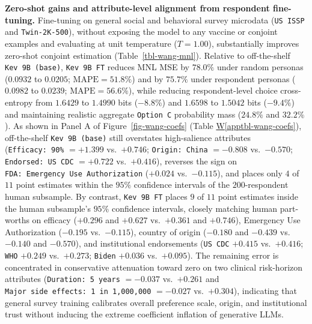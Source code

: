 \documentclass[
  letterpaper,
  DIV=11,
  numbers=noendperiod]{scrartcl}
\newcommand*\quartoapptblref[1]{Table \hyperref[#1]{W\ref{#1}}}
\begin{document}
\textbf{Zero-shot gains and attribute-level alignment from respondent
fine-tuning.} Fine-tuning on general social and behavioral survey
microdata (\texttt{US\ ISSP} and \texttt{Twin-2K-500}), without exposing
the model to any vaccine or conjoint examples and evaluating at unit
temperature (\(T = 1.00\)), substantially improves zero-shot conjoint
estimation (Table~\ref{tbl-wang-mnl}). Relative to off-the-shelf
\texttt{Kev\ 9B\ (base)}, \texttt{Kev\ 9B\ FT} reduces MNL MSE by
\(78.0\%\) under random personas (\(0.0932\) to \(0.0205\);
\(\mathrm{MAPE} = 51.8\%\)) and by \(75.7\%\) under respondent personas
(\(0.0982\) to \(0.0239\); \(\mathrm{MAPE} = 56.6\%\)), while reducing
respondent-level choice cross-entropy from \(1.6429\) to \(1.4990\) bits
(\(-8.8\%\)) and \(1.6598\) to \(1.5042\) bits (\(-9.4\%\)) and
maintaining realistic aggregate \texttt{Option\ C} probability mass
(\(24.8\%\) and \(32.2\%\)). As shown in Panel A of
Figure~\ref{fig-wang-coefs} (\quartoapptblref{apptbl-wang-coefs}),
off-the-shelf \texttt{Kev\ 9B\ (base)} still overstates high-salience
attributes (\texttt{Efficacy:\ 90\%} \(= +1.399\) vs.~\(+0.746\);
\texttt{Origin:\ China} \(= -0.808\) vs.~\(-0.570\);
\texttt{Endorsed:\ US\ CDC} \(= +0.722\) vs.~\(+0.416\)), reverses the
sign on \texttt{FDA:\ Emergency\ Use\ Authorization} (\(+0.024\)
vs.~\(-0.115\)), and places only \(4\) of \(11\) point estimates within
the \(95\%\) confidence intervals of the \(200\)-respondent human
subsample. By contrast, \texttt{Kev\ 9B\ FT} places \(9\) of \(11\)
point estimates inside the human subsample's \(95\%\) confidence
intervals, closely matching human part-worths on efficacy (\(+0.296\)
and \(+0.627\) vs.~\(+0.361\) and \(+0.746\)), Emergency Use
Authorization (\(-0.195\) vs.~\(-0.115\)), country of origin (\(-0.180\)
and \(-0.439\) vs.~\(-0.140\) and \(-0.570\)), and institutional
endorsements (\texttt{US\ CDC} \(+0.415\) vs.~\(+0.416\); \texttt{WHO}
\(+0.249\) vs.~\(+0.273\); \texttt{Biden} \(+0.036\) vs.~\(+0.095\)).
The remaining error is concentrated in conservative attenuation toward
zero on two clinical risk-horizon attributes
(\texttt{Duration:\ 5\ years} \(= -0.037\) vs.~\(+0.261\) and
\texttt{Major\ side\ effects:\ 1\ in\ 1,000,000} \(= -0.027\)
vs.~\(+0.304\)), indicating that general survey training calibrates
overall preference scale, origin, and institutional trust without
inducing the extreme coefficient inflation of generative LLMs.
\end{document}
